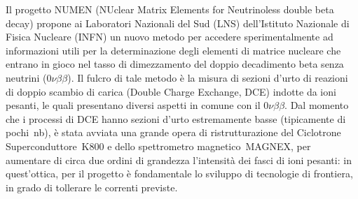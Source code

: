 \documentclass[10pt,foldmark]{leaflet}
\newcommand{\doppiobeta}{$ 0\nu\beta\beta$}
\begin{document}
Il progetto NUMEN (NUclear Matrix Elements for Neutrinoless double beta decay) propone ai Laboratori Nazionali del Sud (LNS) dell'Istituto Nazionale di Fisica Nucleare (INFN) un nuovo metodo per accedere sperimentalmente ad informazioni utili per la determinazione degli elementi di matrice nucleare che entrano in gioco nel tasso di dimezzamento del doppio decadimento beta senza neutrini (\doppiobeta).
Il fulcro di tale metodo è la misura di sezioni d'urto di reazioni di doppio scambio di carica (Double Charge Exchange, DCE) indotte da ioni pesanti, le quali presentano diversi aspetti in comune con il \doppiobeta.
%
%
%
%
Dal momento che i processi di DCE hanno sezioni d'urto estremamente basse (tipicamente di pochi~nb), è stata avviata una grande opera di ristrutturazione del Ciclotrone Superconduttore~K800 e dello spettrometro magnetico~MAGNEX, per aumentare di circa due ordini di grandezza l'intensità dei fasci di ioni pesanti: in quest'ottica, per il progetto è fondamentale lo sviluppo di tecnologie di frontiera, in grado di tollerare le correnti previste.
\end{document}
